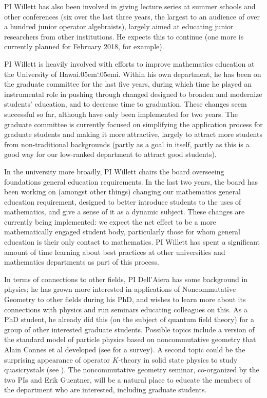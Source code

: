 \documentclass[11pt]{article}
\newcommand{\Hawaii}{Hawai\kern.05em`\kern.05em\relax i}
\theoremstyle{plain}
\theoremstyle{definition}
\theoremstyle{remark}
\begin{document}
PI Willett has also been involved in giving lecture series at summer schools and other conferences (six over the last three years, the largest to an audience of over a hundred junior operator algebraists), largely aimed at educating junior researchers from other institutions.  He expects this to continue (one more is currently planned for February 2018, for example).  

PI Willett is heavily involved with efforts to improve mathematics education at the University of \Hawaii.  Within his own department, he has been on the graduate committee for the last five years, during which time he played an instrumental role in pushing through changed designed to broaden and modernize students' education, and to decrease time to graduation.  These changes seem successful so far, although have only been implemented for two years.  The graduate committee is currently focused on simplifying the application process for graduate students and making it more attractive, largely to attract more students from non-traditional backgrounds (partly as a goal in itself, partly as this is a good way for our low-ranked department to attract good students).

In the university more broadly, PI Willett chairs the board overseeing foundations general education requirements.  In the last two years, the board has been working on (amongst other things) changing our mathematics general education requirement, designed to better introduce students to the uses of mathematics, and give a sense of it as a dynamic subject.  These changes are currently being implemented: we expect the net effect to be a more mathematically engaged student body, particularly those for whom general education is their only contact to mathematics.  PI Willett has spent a significant amount of time learning about best practices at other universities and mathematics departments as part of this process.  


In terms of connections to other fields, PI Dell'Aiera has some background in physics; %
he has grown more interested in applications of Noncommutative Geometry to other fields during his PhD, and wishes to learn more about its connections with physics and run seminars educating colleagues on this.  As a PhD student, he already did this (on the subject of quantum field theory) for a group of other interested graduate students.  Possible topics include a version of the standard model of particle physics based on noncommutative geometry that  Alain Connes et al developed (see \cite{ChamseddineConnes} for a survey). A second topic could be the surprising appearance of operator $K$-theory in solid state physics to study quasicrystals (see \cite{Bellissard}).  The noncommutative geometry seminar, co-organized by the two PIs and Erik Guentner, will be a natural place to educate the members of the department who are interested, including graduate students.







 

\pagebreak

\end{document}
